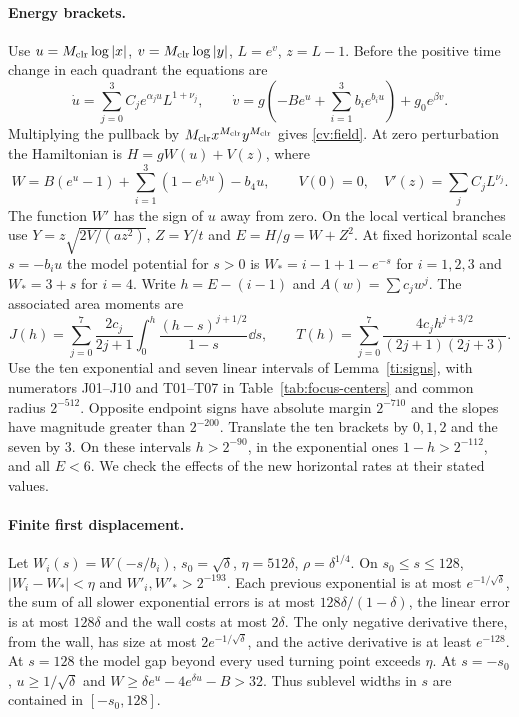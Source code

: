 \paragraph{Energy brackets.}
Use $u=M_{\mathrm{clr}}{}\log|x|$, $v=M_{\mathrm{clr}}{}\log|y|$, $L=e^v$, $z=L-1$. Before the positive
time change in each quadrant the equations are
\[
 \dot u=\sum_{j=0}^3 C_j e^{\alpha_j u}L^{1+\nu_j},\qquad
 \dot v=g\left(-Be^u+\sum_{i=1}^3b_i e^{b_i u}\right)+g_0e^{\beta v}.
\]
Multiplying the pullback by $M_{\mathrm{clr}}{}x^{M_{\mathrm{clr}}}y^{M_{\mathrm{clr}}}$ gives \eqref{cv:field}. At zero
perturbation the Hamiltonian is $H=gW(u)+V(z)$, where
\[
 W=B(e^u-1)+\sum_{i=1}^3(1-e^{b_i u})-b_4u,\qquad
 V(0)=0,\quad V'(z)=\sum_j C_j L^{\nu_j}.
\]
The function $W'$ has the sign of $u$ away from zero. On the local
vertical branches use $Y=z\sqrt{2V/(az^2)}$, $Z=Y/t$ and $E=H/g=W+Z^2$.
At fixed horizontal scale $s=-b_i u$ the model potential for $s>0$
is $W_*=i-1+1-e^{-s}$ for $i=1,2,3$ and $W_*=3+s$ for $i=4$. Write
$h=E-(i-1)$ and $A(w)=\sum c_j w^j$. The associated area moments are
\[
 J(h)=\sum_{j=0}^7\frac{2c_j}{2j+1}\int_0^h
       \frac{(h-s)^{j+1/2}}{1-s}\dd s,\qquad
 T(h)=\sum_{j=0}^7\frac{4c_j h^{j+3/2}}{(2j+1)(2j+3)} .
\]
Use the ten exponential and seven linear intervals of
Lemma~\ref{ti:signs}, with numerators J01--J10 and T01--T07 in Table~\ref{tab:focus-centers} and common radius $2^{-512}$. Opposite endpoint signs have absolute
margin $2^{-710}$ and the slopes have magnitude greater than $2^{-200}$.
Translate the ten brackets by $0,1,2$ and the seven by $3$. On these
intervals $h>2^{-90}$, in the exponential ones $1-h>2^{-112}$, and all
$E<6$. We check the effects of the new horizontal rates at their stated
values.

\paragraph{Finite first displacement.}
Let $W_i(s)=W(-s/b_i)$, $s_0=\sqrt\delta$, $\eta=512\delta$,
$\rho=\delta^{1/4}$. On $s_0\le s\le128$,
$|W_i-W_*|<\eta$ and $W'_i,W'_* >2^{-193}$. Each previous exponential
is at most $e^{-1/\sqrt\delta}$, the sum of all slower exponential
errors is at most $128\delta/(1-\delta)$, the linear error is at most
$128\delta$ and the wall costs at most $2\delta$. The only negative
derivative there, from the wall, has size at most
$2e^{-1/\sqrt\delta}$, and the active derivative is at least $e^{-128}$.
At $s=128$ the model gap beyond every used turning point exceeds $\eta$.
At $s=-s_0$, $u\ge1/\sqrt\delta$ and $W\ge\delta e^u-4e^{\delta u}-B>32$.
Thus sublevel widths in $s$ are contained in $[-s_0,128]$.

